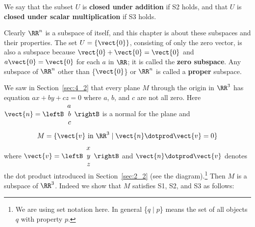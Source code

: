 \noindent We say that the subset $U$ is \textbf{closed under addition} if S2 holds, and that $U$ is \textbf{closed under scalar multiplication} if S3 holds.

Clearly $\RR^n$ is a subspace of itself, and this chapter is about these subspaces and their properties. The set $U = \{\vect{0}\}$,
consisting of only the zero vector, is also a subspace because
$\vect{0} + \vect{0} = \vect{0}$ and $a\vect{0} = \vect{0}$ for each
$a$ in $\RR$; it is called the \textbf{zero subspace}. Any subspace of $\RR^n$ other than \{$\vect{0}$\} or
$\RR^n$ is called a \textbf{proper} subspace.

\begin{wrapfigure}[4]{l}{5cm} 
	\centering
	\vspace*{-2em}
	
\end{wrapfigure}

We saw in Section~\ref{sec:4_2} that every plane $M$ through the origin in $\RR^3$
 has equation $ax + by + cz = 0$ where $a$, $b$, and $c$ are not all zero. Here  $\vect{n} = 
 \leftB \begin{array}{r}
 a \\
 b \\
 c
 \end{array} \rightB $ 
 is a normal for the plane and
\begin{equation*}
	M = \{ \vect{v} \mbox{ in } \RR^3 \mid \vect{n} \dotprod \vect{v} = 0 \}
\end{equation*}
where 
$\vect{v} = 
\leftB \begin{array}{r}
x \\
y \\
z
\end{array} \rightB$
 and $\vect{n} \dotprod \vect{v}$ denotes the dot product introduced in Section~\ref{sec:2_2} (see the diagram).\footnote{We are using set notation here. In general \{$q \mid p$\} means the set of all objects $q$ with property $p$.}
 Then $M$ is a subspace of $\RR^3$. Indeed we show that $M$ satisfies S1, S2, and S3 as follows:

